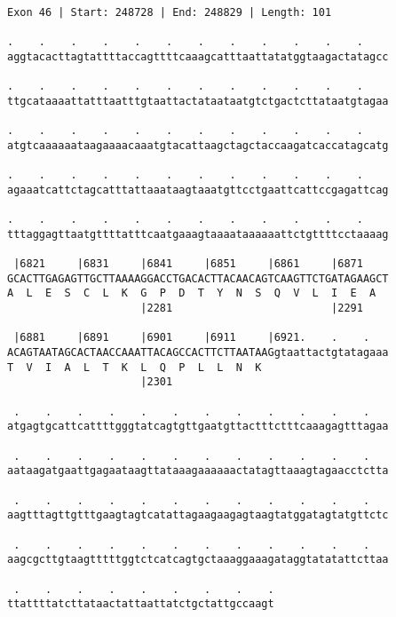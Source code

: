 \documentclass{article}
\begin{document}
\newpage
\begin{Verbatim}[fontfamily=courier]
Exon 46 | Start: 248728 | End: 248829 | Length: 101

.    .    .    .    .    .    .    .    .    .    .    .    
aggtacacttagtattttaccagttttcaaagcatttaattatatggtaagactatagcc

.    .    .    .    .    .    .    .    .    .    .    .    
ttgcataaaattatttaatttgtaattactataataatgtctgactcttataatgtagaa

.    .    .    .    .    .    .    .    .    .    .    .    
atgtcaaaaaataagaaaacaaatgtacattaagctagctaccaagatcaccatagcatg

.    .    .    .    .    .    .    .    .    .    .    .    
agaaatcattctagcatttattaaataagtaaatgttcctgaattcattccgagattcag

.    .    .    .    .    .    .    .    .    .    .    .    
tttaggagttaatgttttatttcaatgaaagtaaaataaaaaattctgttttcctaaaag

 |6821     |6831     |6841     |6851     |6861     |6871    
GCACTTGAGAGTTGCTTAAAAGGACCTGACACTTACAACAGTCAAGTTCTGATAGAAGCT
A  L  E  S  C  L  K  G  P  D  T  Y  N  S  Q  V  L  I  E  A  
                     |2281                         |2291    

 |6881     |6891     |6901     |6911     |6921.    .    .   
ACAGTAATAGCACTAACCAAATTACAGCCACTTCTTAATAAGgtaattactgtatagaaa
T  V  I  A  L  T  K  L  Q  P  L  L  N  K                    
                     |2301                                  

 .    .    .    .    .    .    .    .    .    .    .    .   
atgagtgcattcattttgggtatcagtgttgaatgttactttctttcaaagagtttagaa

 .    .    .    .    .    .    .    .    .    .    .    .   
aataagatgaattgagaataagttataaagaaaaaactatagttaaagtagaacctctta

 .    .    .    .    .    .    .    .    .    .    .    .   
aagtttagttgtttgaagtagtcatattagaagaagagtaagtatggatagtatgttctc

 .    .    .    .    .    .    .    .    .    .    .    .   
aagcgcttgtaagtttttggtctcatcagtgctaaaggaaagataggtatatattcttaa

 .    .    .    .    .    .    .    .    .
ttattttatcttataactattaattatctgctattgccaagt
\end{Verbatim}
\newpage
\end{document}
